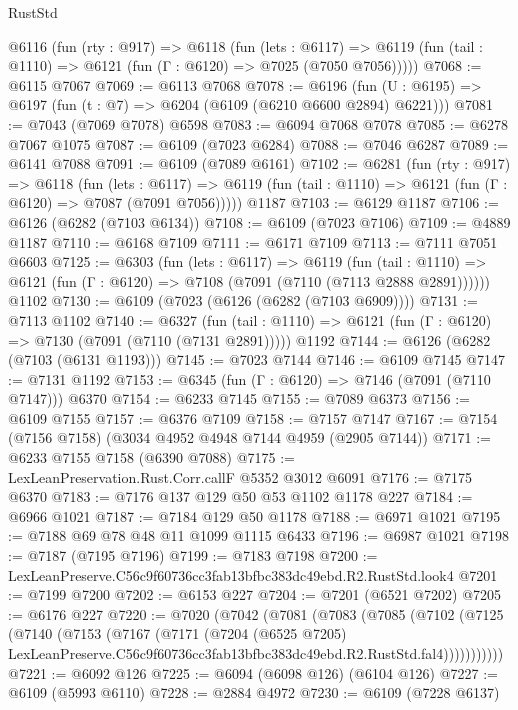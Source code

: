 \begin{lexlean}{RustStd}
\begin{coremodule}
  @6116
    (fun (rty : @917) =>
    @6118
      (fun (lets : @6117) =>
      @6119 (fun (tail : @1110) => @6121 (fun (Γ : @6120) => @7025 (@7050 @7056)))))
@7068 := @6115 @7067
@7069 := @6113 @7068
@7078 := @6196 (fun (U : @6195) => @6197 (fun (t : @7) => @6204 (@6109 (@6210 @6600 @2894) @6221)))
@7081 := @7043 (@7069 @7078) @6598
@7083 := @6094 @7068 @7078
@7085 := @6278 @7067 @1075
@7087 := @6109 (@7023 @6284)
@7088 := @7046 @6287
@7089 := @6141 @7088
@7091 := @6109 (@7089 @6161)
@7102 := @6281
    (fun (rty : @917) =>
    @6118
      (fun (lets : @6117) =>
      @6119 (fun (tail : @1110) => @6121 (fun (Γ : @6120) => @7087 (@7091 @7056)))))
    @1187
@7103 := @6129 @1187
@7106 := @6126 (@6282 (@7103 @6134))
@7108 := @6109 (@7023 @7106)
@7109 := @4889 @1187
@7110 := @6168 @7109
@7111 := @6171 @7109
@7113 := @7111 @7051 @6603
@7125 := @6303
    (fun (lets : @6117) =>
    @6119
      (fun (tail : @1110) => @6121 (fun (Γ : @6120) => @7108 (@7091 (@7110 (@7113 @2888 @2891))))))
    @1102
@7130 := @6109 (@7023 (@6126 (@6282 (@7103 @6909))))
@7131 := @7113 @1102
@7140 := @6327
    (fun (tail : @1110) => @6121 (fun (Γ : @6120) => @7130 (@7091 (@7110 (@7131 @2891)))))
    @1192
@7144 := @6126 (@6282 (@7103 (@6131 @1193)))
@7145 := @7023 @7144
@7146 := @6109 @7145
@7147 := @7131 @1192
@7153 := @6345 (fun (Γ : @6120) => @7146 (@7091 (@7110 @7147))) @6370
@7154 := @6233 @7145
@7155 := @7089 @6373
@7156 := @6109 @7155
@7157 := @6376 @7109
@7158 := @7157 @7147
@7167 := @7154 (@7156 @7158) (@3034 @4952 @4948 @7144 @4959 (@2905 @7144))
@7171 := @6233 @7155 @7158 (@6390 @7088)
@7175 := LexLeanPreservation.Rust.Corr.callF @5352 @3012 @6091
@7176 := @7175 @6370
@7183 := @7176 @137 @129 @50 @53 @1102 @1178 @227
@7184 := @6966 @1021
@7187 := @7184 @129 @50 @1178
@7188 := @6971 @1021
@7195 := @7188 @69 @78 @48 @11 @1099 @1115 @6433
@7196 := @6987 @1021
@7198 := @7187 (@7195 @7196)
@7199 := @7183 @7198
@7200 := LexLeanPreserve.C56c9f60736cc3fab13bfbc383dc49ebd.R2.RustStd.look4
@7201 := @7199 @7200
@7202 := @6153 @227
@7204 := @7201 (@6521 @7202)
@7205 := @6176 @227
@7220 := @7020
    (@7042
      (@7081
        (@7083
          (@7085
            (@7102
              (@7125
                (@7140
                  (@7153
                    (@7167
                      (@7171
                        (@7204
                          (@6525 @7205)
                          LexLeanPreserve.C56c9f60736cc3fab13bfbc383dc49ebd.R2.RustStd.fal4)))))))))))
@7221 := @6092 @126
@7225 := @6094 (@6098 @126) (@6104 @126)
@7227 := @6109 (@5993 @6110)
@7228 := @2884 @4972
@7230 := @6109 (@7228 @6137)

\end{coremodule}
\end{lexlean}
